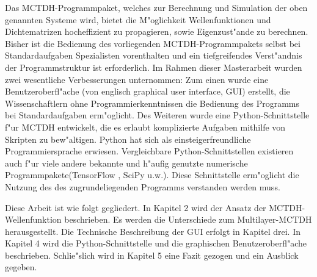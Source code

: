 Das MCTDH-Programmpaket, welches zur Berechnung und Simulation der oben genannten Systeme wird, bietet die M"oglichkeit
Wellenfunktionen und Dichtematrizen hocheffizient zu propagieren, sowie Eigenzust"ande zu berechnen.
Bisher ist die Bedienung des vorliegenden MCTDH-Programmpakets selbst bei Standardaufgaben Spezialisten vorenthalten und 
ein tiefgreifendes Verst"andnis der Programmstruktur ist erforderlich. 
Im Rahmen dieser Masterarbeit wurden zwei wesentliche Verbesserungen unternommen: 
Zum einen wurde eine Benutzeroberfl"ache (von englisch graphical user interface, GUI) erstellt, die Wissenschaftlern
ohne Programmierkenntnissen die Bedienung des Programms bei Standardaufgaben erm"oglicht.
Des Weiteren wurde eine Python-Schnittstelle f"ur MCTDH entwickelt,
die es erlaubt komplizierte Aufgaben mithilfe von Skripten zu bew"altigen.
Python hat sich als einsteigerfreundliche Programmiersprache erwiesen. Vergleichbare Python-Schnittstellen existieren auch f"ur viele andere bekannte und h"aufig genutzte 
numerische Programmpakete(TensorFlow \cite{TensorFlow}, SciPy \cite{SciPy} u.w.).
Diese Schnittstelle erm"oglicht die Nutzung des
des zugrundeliegenden Programms verstanden werden muss.
 
Diese Arbeit ist wie folgt gegliedert. In Kapitel 2 wird der Ansatz der MCTDH-Wellenfunk\-tion beschrieben. 
Es werden die Unterschiede zum Multilayer-MCTDH herausgestellt. Die Technische Beschreibung
der GUI erfolgt in Kapitel drei.
In Kapitel 4 wird die Python-Schnittstelle und die graphischen Benutzeroberfl"ache beschrieben.     
Schlie"slich wird in Kapitel 5 eine Fazit gezogen und ein Ausblick gegeben.     